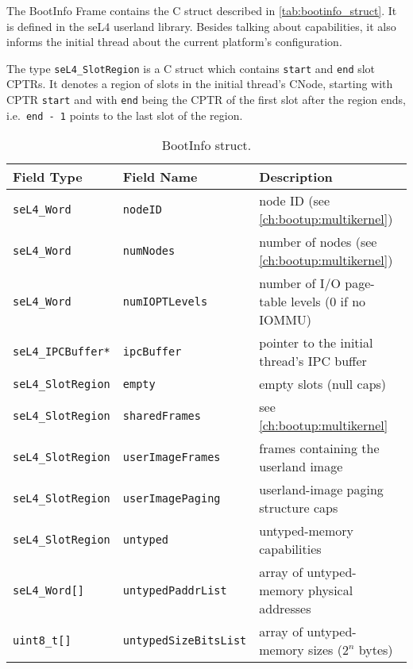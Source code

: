 The BootInfo Frame contains the C struct described in
\autoref{tab:bootinfo_struct}.
It is defined in the seL4 userland library. Besides talking about
capabilities, it also informs the initial thread about
the current platform's configuration.

The type \texttt{seL4\_SlotRegion} is a C struct
which contains \texttt{start} and \texttt{end} slot CPTRs. It denotes a region
of slots in the initial thread's CNode, starting with CPTR \texttt{start} and with
\texttt{end} being the CPTR of the first slot after the region ends, i.e.\
\texttt{end - 1} points to the last slot of the region.

\begin{table}[htb]
  \begin{center}
    \caption{BootInfo struct.}
    \label{tab:bootinfo_struct}
    \begin{tabularx}{\textwidth}{llX}
      \toprule
      Field Type & Field Name & Description \\
      \midrule
      \texttt{seL4\_Word}           & \texttt{nodeID}                  & node ID (see \autoref{ch:bootup:multikernel}) \\
      \texttt{seL4\_Word}           & \texttt{numNodes}                & number of nodes (see \autoref{ch:bootup:multikernel}) \\
      \texttt{seL4\_Word}           & \texttt{numIOPTLevels}           & number of I/O page-table levels (0 if no IOMMU) \\
      \texttt{seL4\_IPCBuffer*}     & \texttt{ipcBuffer}               & pointer to the initial thread's IPC buffer \\
      \texttt{seL4\_SlotRegion}     & \texttt{empty}                   & empty slots (null caps) \\
      \texttt{seL4\_SlotRegion}     & \texttt{sharedFrames}            & see \autoref{ch:bootup:multikernel} \\
      \texttt{seL4\_SlotRegion}     & \texttt{userImageFrames}         & frames containing the userland image \\
      \texttt{seL4\_SlotRegion}     & \texttt{userImagePaging}         & userland-image paging structure caps \\
      \texttt{seL4\_SlotRegion}     & \texttt{untyped}                 & untyped-memory capabilities \\
      \texttt{seL4\_Word[]}         & \texttt{untypedPaddrList}        & array of untyped-memory physical addresses \\
      \texttt{uint8\_t[]}           & \texttt{untypedSizeBitsList}     & array of untyped-memory sizes ($2^n$ bytes) \\

\end{tabularx}
\end{center}
\end{table}
